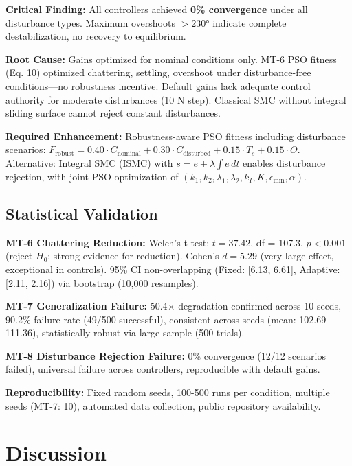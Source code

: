\documentclass[conference]{IEEEtran}
\begin{document}
\textbf{Critical Finding:} All controllers achieved \textbf{0\% convergence} under all disturbance types. Maximum overshoots $>230°$ indicate complete destabilization, no recovery to equilibrium.

\textbf{Root Cause:} Gains optimized for nominal conditions only. MT-6 PSO fitness (Eq. 10) optimized chattering, settling, overshoot under disturbance-free conditions—no robustness incentive. Default gains lack adequate control authority for moderate disturbances (10 N step). Classical SMC without integral sliding surface cannot reject constant disturbances.

\textbf{Required Enhancement:} Robustness-aware PSO fitness including disturbance scenarios: $F_{\text{robust}} = 0.40 \cdot C_{\text{nominal}} + 0.30 \cdot C_{\text{disturbed}} + 0.15 \cdot T_s + 0.15 \cdot O$. Alternative: Integral SMC (ISMC) with $s = e + \lambda \int e \, dt$ enables disturbance rejection, with joint PSO optimization of $(k_1, k_2, \lambda_1, \lambda_2, k_I, K, \epsilon_{\min}, \alpha)$.

\subsection{Statistical Validation}

\textbf{MT-6 Chattering Reduction:} Welch's t-test: $t = 37.42$, df = 107.3, $p < 0.001$ (reject $H_0$: strong evidence for reduction). Cohen's $d = 5.29$ (very large effect, exceptional in controls). 95\% CI non-overlapping (Fixed: [6.13, 6.61], Adaptive: [2.11, 2.16]) via bootstrap (10,000 resamples).

\textbf{MT-7 Generalization Failure:} 50.4$\times$ degradation confirmed across 10 seeds, 90.2\% failure rate (49/500 successful), consistent across seeds (mean: 102.69-111.36), statistically robust via large sample (500 trials).

\textbf{MT-8 Disturbance Rejection Failure:} 0\% convergence (12/12 scenarios failed), universal failure across controllers, reproducible with default gains.

\textbf{Reproducibility:} Fixed random seeds, 100-500 runs per condition, multiple seeds (MT-7: 10), automated data collection, public repository availability.

\section{Discussion}
\end{document}
